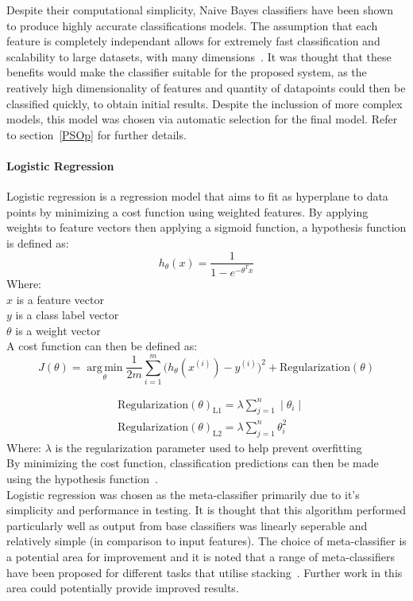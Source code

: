 \documentclass[titlepage, 12pt]{scrartcl} \usepackage{enumitem}
\DeclareMathOperator*{\argmin}{arg\,min}
\begin{document}
Despite their computational simplicity, Naive Bayes classifiers have been shown
to produce highly accurate classifications models. The assumption that each feature is
completely independant allows for extremely fast classification and scalability
to large datasets, with many dimensions~\parencite[p.300]{Zhang2004}. It was
thought that these benefits would make the classifier suitable for the proposed system, as the reatively high
dimensionality of features and quantity of datapoints could then be classified
quickly, to obtain initial results. Despite the inclussion of more complex
models, this model was chosen via automatic selection for the final model.
Refer to section~\ref{PSOp} for further details.

\paragraph{Logistic Regression}
Logistic regression is a regression model that aims to fit as hyperplane to
data points by minimizing a cost function using weighted features.
By applying weights to feature vectors then applying a sigmoid function, a
hypothesis function is defined as:
\begin{equation}
    h_\theta(x)=\frac{1}{1-e^{-\theta^{T}x}}
\end{equation}
Where:\\
$x$ is a feature vector\\
$y$ is a class label vector \\
$\theta$ is a weight vector \\
A cost function can then be defined as:
\begin{equation}
    J(\theta)=\argmin\limits_\theta\frac{1}{2m}\sum\limits_{i=1}^m\Big(h_\theta(x^{(i)})-y^{(i)}\Big)^2+\text{Regularization}(\theta)
\end{equation}

\begin{align}
    &\text{Regularization}{(\theta)}_\text{L1}=\lambda\sum\limits_{j=1}^n\mid\theta_i\mid\\
    &\text{Regularization}{(\theta)}_\text{L2}=\lambda\sum\limits_{j=1}^n\theta_i^2
\end{align}
Where:
$\lambda$ is the regularization parameter used to help prevent overfitting\\
By minimizing the cost function, classification predictions can then be made
using the hypothesis function~\parencite{Ng2012}.\\
Logistic regression was chosen as the meta-classifier primarily due to it's
simplicity and performance in testing. It is thought that this algorithm
performed particularly well as output from base classifiers was linearly
seperable and relatively simple (in comparison to input features). The choice of
meta-classifier is a potential area for improvement and it is noted that a
range of meta-classifiers have been proposed for different tasks that utilise
stacking~\parencite[p.29]{Sesmero2015}. Further work in this area could
potentially provide improved results.
\end{document}
